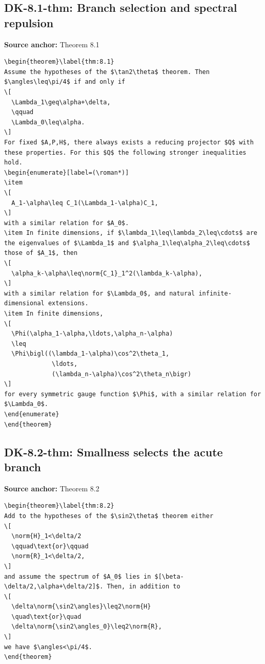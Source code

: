 \subsection*{DK-8.1-thm: Branch selection and spectral repulsion}
\noindent\textbf{Source anchor:} Theorem 8.1\\
\begin{verbatim}
\begin{theorem}\label{thm:8.1}
Assume the hypotheses of the $\tan2\theta$ theorem. Then $\angles\leq\pi/4$ if and only if
\[
  \Lambda_1\geq\alpha+\delta,
  \qquad
  \Lambda_0\leq\alpha.
\]
For fixed $A,P,H$, there always exists a reducing projector $Q$ with these properties. For this $Q$ the following stronger inequalities hold.
\begin{enumerate}[label=(\roman*)]
\item
\[
  A_1-\alpha\leq C_1(\Lambda_1-\alpha)C_1,
\]
with a similar relation for $A_0$.
\item In finite dimensions, if $\lambda_1\leq\lambda_2\leq\cdots$ are the eigenvalues of $\Lambda_1$ and $\alpha_1\leq\alpha_2\leq\cdots$ those of $A_1$, then
\[
  \alpha_k-\alpha\leq\norm{C_1}_1^2(\lambda_k-\alpha),
\]
with a similar relation for $\Lambda_0$, and natural infinite-dimensional extensions.
\item In finite dimensions,
\[
  \Phi(\alpha_1-\alpha,\ldots,\alpha_n-\alpha)
  \leq
  \Phi\bigl((\lambda_1-\alpha)\cos^2\theta_1,
             \ldots,
             (\lambda_n-\alpha)\cos^2\theta_n\bigr)
\]
for every symmetric gauge function $\Phi$, with a similar relation for $\Lambda_0$.
\end{enumerate}
\end{theorem}
\end{verbatim}

\subsection*{DK-8.2-thm: Smallness selects the acute branch}
\noindent\textbf{Source anchor:} Theorem 8.2\\
\begin{verbatim}
\begin{theorem}\label{thm:8.2}
Add to the hypotheses of the $\sin2\theta$ theorem either
\[
  \norm{H}_1<\delta/2
  \qquad\text{or}\qquad
  \norm{R}_1<\delta/2,
\]
and assume the spectrum of $A_0$ lies in $[\beta-\delta/2,\alpha+\delta/2]$. Then, in addition to
\[
  \delta\norm{\sin2\angles}\leq2\norm{H}
  \quad\text{or}\quad
  \delta\norm{\sin2\angles_0}\leq2\norm{R},
\]
we have $\angles<\pi/4$.
\end{theorem}
\end{verbatim}

